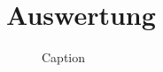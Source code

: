 \chapter{Auswertung}
\begin{figure}[H]
    \centering
    
    \caption{Caption}
    \label{fig:my_label}
\end{figure}